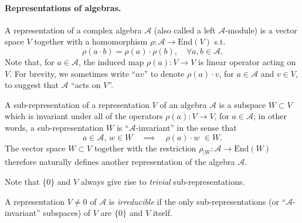 \paragraph{Representations of algebras.}

\begin{definition}
A representation of a complex algebra $\mathcal{A}$ (also called a left $\mathcal{A}$-module) is a vector space $V$ together with a homomorphism $\rho: \mathcal{A} \rightarrow \mathrm{End}(V)$ s.t.
$$
\rho(a \cdot b) = \rho(a) \cdot \rho(b), \quad \forall a,b \in \mathcal{A}.
$$
Note that, for $a \in \mathcal{A}$, the induced map $\rho(a) : V \rightarrow V$ is linear operator acting on $V$. For brevity, we sometimes write ``$av$'' to denote $\rho(a) \cdot v$, for $a \in \mathcal{A}$ and $v \in V$, to suggest that $\mathcal{A}$ ``acts on $V$''.
\end{definition}


\begin{definition}
A sub-representation of a representation $V$ of an algebra $\mathcal{A}$ is a subspace $W \subset V$ which is invariant under all of the operators $\rho(a): V \rightarrow V$, for $a \in \mathcal{A}$; in other words, a sub-representation $W$ is ``$\mathcal{A}$-invariant'' in the sense that
$$
a \in \mathcal{A}, \, w \in W \quad \implies \quad \rho(a) \cdot w \,\,\in W.
$$
The vector space $W \subset V$ together with the restriction $\rho_{|W}: \mathcal{A} \rightarrow \mathrm{End}(W)$ therefore naturally defines another representation of  the algebra $\mathcal{A}$.
\end{definition}

Note that $\{0\}$ and $V$ always give rise to \emph{trivial} sub-representations.

\begin{definition}
A representation $V \neq 0$ of $\mathcal{A}$ is \emph{irreducible} if the only sub-representations (or ``$\mathcal{A}$-invariant'' subspaces) of $V$ are $\{0\}$ and $V$ itself.
\end{definition}

